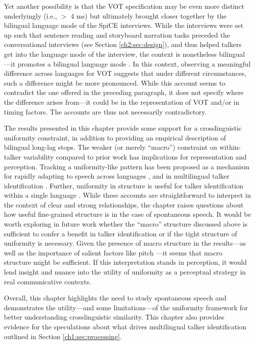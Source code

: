 Yet another possibility is that the VOT specification may be even more distinct underlyingly (i.e., $>$ 4 ms) but ultimately brought closer together by the bilingual language mode of the SpiCE interviews. While the interviews were set up such that sentence reading and storyboard narration tasks preceded the conversational interviews (see Section \ref{ch2:sec:design}), and thus helped talkers get into the language mode of the interview, the context is nonetheless bilingual---it promotes a bilingual language mode \citep[see][]{grosjean_2011_transfer}. In this context, observing a meaningful difference across languages for VOT suggests that under different circumstances, such a difference might be more pronounced. While this account seems to contradict the one offered in the preceding paragraph, it does not specify where the difference arises from---it could be in the representation of VOT and/or in timing factors. The accounts are thus not necessarily contradictory.

The results presented in this chapter provide some support for a crosslinguistic uniformity constraint, in addition to providing an empirical description of bilingual long-lag stops. The weaker (or merely ``macro'') constraint on within-talker variability compared to prior work has implications for representation and perception. Tracking a uniformity-like pattern has been proposed as a mechanism for rapidly adapting to speech across languages \citep{reinisch_2013_retune}, and in multilingual talker identification \citep{orena_2019_identifying}. Further, uniformity in structure is useful for talker identification within a single language \citep{ganugapati_2019_structured}. While these accounts are straightforward to interpret in the context of clear and strong relationships, the chapter raises questions about how useful fine-grained structure is in the case of spontaneous speech. It would be worth exploring in future work whether the ``macro'' structure discussed above is sufficient to confer a benefit in talker identification or if the tight structure of uniformity is necessary. Given the presence of macro structure in the results---as well as the importance of salient factors like pitch \citep[over more subtle factors;][]{perrachione_2019_judgments}---it seems that macro structure might be sufficient. If this interpretation stands in perception, it would lend insight and nuance into the utility of uniformity as a perceptual strategy in real communicative contexts. 

Overall, this chapter highlights the need to study spontaneous speech and demonstrates the utility---and some limitations---of the uniformity framework for better understanding crosslinguistic similarity. This chapter also provides evidence for the speculations about what drives multilingual talker identification \citep{orena_2019_identifying} outlined in Section \ref{ch1:sec:processing}.


